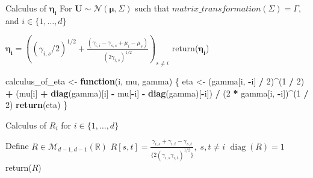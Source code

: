 \documentclass[
]{article}
\newenvironment{Shaded}{\begin{snugshade}}{\end{snugshade}}
\newcommand{\ControlFlowTok}[1]{\textcolor[rgb]{0.13,0.29,0.53}{\textbf{#1}}}
\newcommand{\DecValTok}[1]{\textcolor[rgb]{0.00,0.00,0.81}{#1}}
\newcommand{\FunctionTok}[1]{\textcolor[rgb]{0.13,0.29,0.53}{\textbf{#1}}}
\newcommand{\NormalTok}[1]{#1}
\newcommand{\OtherTok}[1]{\textcolor[rgb]{0.56,0.35,0.01}{#1}}
\newcommand{\SpecialCharTok}[1]{\textcolor[rgb]{0.81,0.36,0.00}{\textbf{#1}}}
\begin{document}
\begin{algorithm}[H]
\caption{ Calculus of $\boldsymbol{\eta_i}$ For $\boldsymbol{U} \sim \mathcal{N}(\boldsymbol{\mu},\Sigma)$ such that $matrix\_transformation(\Sigma)=\Gamma$, and $i \in \{1,\ldots,d\}$}\label{alg:cap}
\begin{algorithmic}[1]
 
\State $\boldsymbol{\eta_i}=\left((\gamma_{i,s}/2)^{1/2}+\tfrac{(\gamma_{i,i}-\gamma_{s,s}+\mu_i-\mu_s)}{(2\gamma_{i,s})^{1/2}}\right)_{s \neq i}$
\State return($\boldsymbol{\eta_i}$)
\EndFunction
\end{algorithmic}
\end{algorithm}

\begin{Shaded}
\begin{Highlighting}[]
\NormalTok{calculus\_of\_eta }\OtherTok{\textless{}{-}} \ControlFlowTok{function}\NormalTok{(i, mu, gamma) \{}
\NormalTok{  eta }\OtherTok{\textless{}{-}}\NormalTok{ (gamma[i, }\SpecialCharTok{{-}}\NormalTok{i] }\SpecialCharTok{/} \DecValTok{2}\NormalTok{)}\SpecialCharTok{\^{}}\NormalTok{(}\DecValTok{1} \SpecialCharTok{/} \DecValTok{2}\NormalTok{) }\SpecialCharTok{+}\NormalTok{ (mu[i] }\SpecialCharTok{+} \FunctionTok{diag}\NormalTok{(gamma)[i] }\SpecialCharTok{{-}}\NormalTok{ mu[}\SpecialCharTok{{-}}\NormalTok{i] }\SpecialCharTok{{-}} \FunctionTok{diag}\NormalTok{(gamma)[}\SpecialCharTok{{-}}\NormalTok{i]) }\SpecialCharTok{/}\NormalTok{ (}\DecValTok{2} \SpecialCharTok{*}\NormalTok{ gamma[i, }\SpecialCharTok{{-}}\NormalTok{i])}\SpecialCharTok{\^{}}\NormalTok{(}\DecValTok{1} \SpecialCharTok{/} \DecValTok{2}\NormalTok{)}
  \FunctionTok{return}\NormalTok{(eta)}
\NormalTok{\}}
\end{Highlighting}
\end{Shaded}

\begin{algorithm}[H]
\caption{ Calculus of $R_i$ for $i \in \{1,\ldots,d\}$}\label{alg:cap}
\begin{algorithmic}[1]
 
\State Define $R \in \mathcal{M}_{d-1,d-1}(\mathbb{R})$ 
\State $R[s,t]=\tfrac{\gamma_{i,s}+\gamma_{i,t}-\gamma_{s,t}}{\{2(\gamma_{i,s} \gamma_{i,t})^{1/2}\}}, \; s,t \neq i$
\State $\operatorname{diag}(R)=1$
\State return($R$)
\EndFunction
\end{algorithmic}
\end{algorithm}
\end{document}

